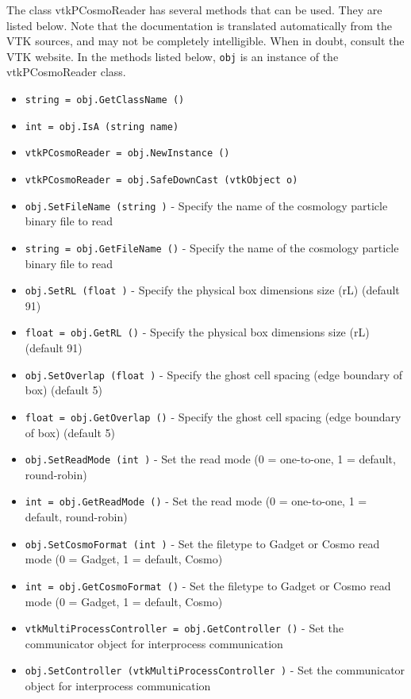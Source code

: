 The class vtkPCosmoReader has several methods that can be used.
  They are listed below.
Note that the documentation is translated automatically from the VTK sources,
and may not be completely intelligible.  When in doubt, consult the VTK website.
In the methods listed below, \verb|obj| is an instance of the vtkPCosmoReader class.
\begin{itemize}
\item  \verb|string = obj.GetClassName ()|

\item  \verb|int = obj.IsA (string name)|

\item  \verb|vtkPCosmoReader = obj.NewInstance ()|

\item  \verb|vtkPCosmoReader = obj.SafeDownCast (vtkObject o)|

\item  \verb|obj.SetFileName (string )| -  Specify the name of the cosmology particle binary file to read

\item  \verb|string = obj.GetFileName ()| -  Specify the name of the cosmology particle binary file to read

\item  \verb|obj.SetRL (float )| -  Specify the physical box dimensions size (rL) (default 91)

\item  \verb|float = obj.GetRL ()| -  Specify the physical box dimensions size (rL) (default 91)

\item  \verb|obj.SetOverlap (float )| -  Specify the ghost cell spacing (edge boundary of box) (default 5)

\item  \verb|float = obj.GetOverlap ()| -  Specify the ghost cell spacing (edge boundary of box) (default 5)

\item  \verb|obj.SetReadMode (int )| -  Set the read mode (0 = one-to-one, 1 = default, round-robin)

\item  \verb|int = obj.GetReadMode ()| -  Set the read mode (0 = one-to-one, 1 = default, round-robin)

\item  \verb|obj.SetCosmoFormat (int )| -  Set the filetype to Gadget or Cosmo read mode (0 = Gadget, 1 = default, Cosmo)

\item  \verb|int = obj.GetCosmoFormat ()| -  Set the filetype to Gadget or Cosmo read mode (0 = Gadget, 1 = default, Cosmo)

\item  \verb|vtkMultiProcessController = obj.GetController ()| -  Set the communicator object for interprocess communication

\item  \verb|obj.SetController (vtkMultiProcessController )| -  Set the communicator object for interprocess communication

\end{itemize}
